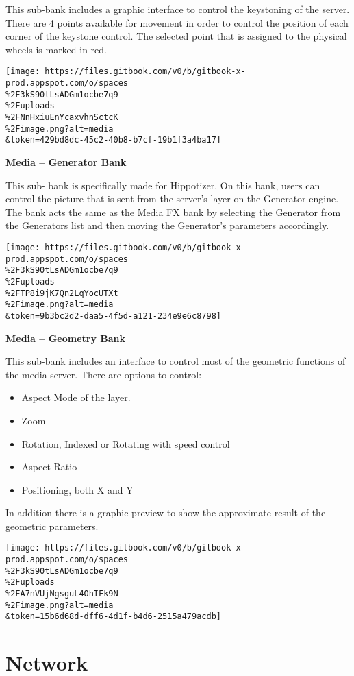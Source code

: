 \documentclass[
]{article}
\begin{document}
This sub-bank includes a graphic interface to control the keystoning of the server. There are 4 points available for movement in order to control the position of each corner of the keystone control. The selected point that is assigned to the physical wheels is marked in red.

\texttt{[image: https://files.gitbook.com/v0/b/gitbook-x-prod.appspot.com/o/spaces\\\%2F3kS90tLsADGm1ocbe7q9\\\%2Fuploads\\\%2FNnHxiuEnYcaxvhnSctcK\\\%2Fimage.png?alt=media\\\&token=429bd8dc-45c2-40b8-b7cf-19b1f3a4ba17]}

\textbf{Media -- Generator Bank}

This sub- bank is specifically made for Hippotizer. On this bank, users can control the picture that is sent from the server's layer on the Generator engine. The bank acts the same as the Media FX bank by selecting the Generator from the Generators list and then moving the Generator's parameters accordingly.

\texttt{[image: https://files.gitbook.com/v0/b/gitbook-x-prod.appspot.com/o/spaces\\\%2F3kS90tLsADGm1ocbe7q9\\\%2Fuploads\\\%2FTP8i9jK7Qn2LqYocUTXt\\\%2Fimage.png?alt=media\\\&token=9b3bc2d2-daa5-4f5d-a121-234e9e6c8798]}

\textbf{Media -- Geometry Bank}

This sub-bank includes an interface to control most of the geometric functions of the media server. There are options to control:

\begin{itemize}
\item
  Aspect Mode of the layer.
\item
  Zoom
\item
  Rotation, Indexed or Rotating with speed control
\item
  Aspect Ratio
\item
  Positioning, both X and Y
\end{itemize}

In addition there is a graphic preview to show the approximate result of the geometric parameters.

\texttt{[image: https://files.gitbook.com/v0/b/gitbook-x-prod.appspot.com/o/spaces\\\%2F3kS90tLsADGm1ocbe7q9\\\%2Fuploads\\\%2FA7nVUjNgsguL4OhIFk9N\\\%2Fimage.png?alt=media\\\&token=15b6d68d-dff6-4d1f-b4d6-2515a479acdb]}

\hypertarget{network-1}{%
\section{Network}\label{network-1}}
\end{document}

